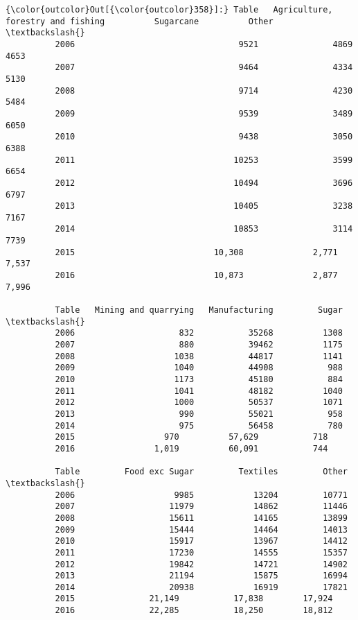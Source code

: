\documentclass[11pt]{article}
\begin{document}
\begin{Verbatim}[commandchars=\\\{\}]
{\color{outcolor}Out[{\color{outcolor}358}]:} Table   Agriculture, forestry and fishing          Sugarcane          Other  \textbackslash{}
          2006                                 9521               4869           4653   
          2007                                 9464               4334           5130   
          2008                                 9714               4230           5484   
          2009                                 9539               3489           6050   
          2010                                 9438               3050           6388   
          2011                                10253               3599           6654   
          2012                                10494               3696           6797   
          2013                                10405               3238           7167   
          2014                                10853               3114           7739   
          2015                            10,308              2,771          7,537      
          2016                            10,873              2,877          7,996      
          
          Table   Mining and quarrying   Manufacturing         Sugar  \textbackslash{}
          2006                     832           35268          1308   
          2007                     880           39462          1175   
          2008                    1038           44817          1141   
          2009                    1040           44908           988   
          2010                    1173           45180           884   
          2011                    1041           48182          1040   
          2012                    1000           50537          1071   
          2013                     990           55021           958   
          2014                     975           56458           780   
          2015                  970          57,629           718      
          2016                1,019          60,091           744      
          
          Table         Food exc Sugar         Textiles         Other  \textbackslash{}
          2006                    9985            13204         10771   
          2007                   11979            14862         11446   
          2008                   15611            14165         13899   
          2009                   15444            14464         14013   
          2010                   15917            13967         14412   
          2011                   17230            14555         15357   
          2012                   19842            14721         14902   
          2013                   21194            15875         16994   
          2014                   20938            16919         17821   
          2015               21,149           17,838        17,924      
          2016               22,285           18,250        18,812      
          

\end{Verbatim}
\end{document}
